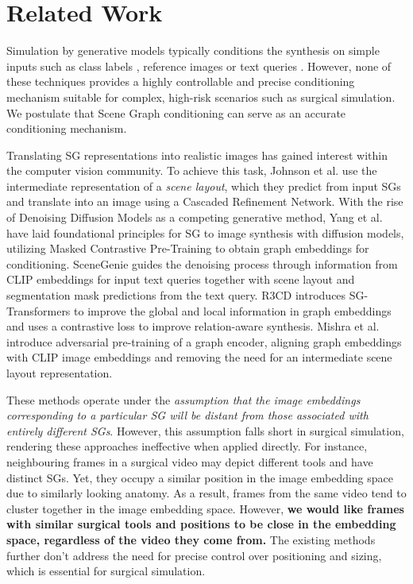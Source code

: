 \section{Related Work}
\label{sec:rw}

Simulation by generative models typically conditions the synthesis on simple inputs such as class labels \cite{muller2023multimodal, frisch2023synthesising}, reference images \cite{kim2022diffusion, fuchsharp} or text queries \cite{allmendinger2024navigating}. However, none of these techniques provides a highly controllable and precise conditioning mechanism suitable for complex, high-risk scenarios such as surgical simulation. We postulate that Scene Graph conditioning can serve as an accurate conditioning mechanism.

Translating SG representations into realistic images has gained interest within the computer vision community. To achieve this task, Johnson et al. \cite{johnson2018image} use the intermediate representation of a \emph{scene layout}, which they predict from input SGs and translate into an image using a Cascaded Refinement Network. With the rise of Denoising Diffusion Models \cite{ho2020denoising,dhariwal2021diffusion,rombach2022high} as a competing generative method, Yang et al. \cite{yang2022diffusion} have laid foundational principles for SG to image synthesis with diffusion models, utilizing Masked Contrastive Pre-Training to obtain graph embeddings for conditioning. SceneGenie \cite{farshad2023scenegenie} guides the denoising process through information from CLIP embeddings \cite{radford2021learning} for input text queries together with scene layout and segmentation mask predictions from the text query. R3CD \cite{liu2024r3cd} introduces SG-Transformers to improve the global and local information in graph embeddings and uses a contrastive loss to improve relation-aware synthesis. Mishra et al. \cite{mishra2024scene} introduce adversarial pre-training of a graph encoder, aligning graph embeddings with CLIP image embeddings \cite{radford2021learning} and removing the need for an intermediate scene layout representation. 

These methods operate under the \textit{assumption that the image embeddings corresponding to a particular SG will be distant from those associated with entirely different SGs}. However, this assumption falls short in surgical simulation, rendering these approaches ineffective when applied directly. For instance, neighbouring frames in a surgical video may depict different tools and have distinct SGs. Yet, they occupy a similar position in the image embedding space due to similarly looking anatomy. As a result, frames from the same video tend to cluster together in the image embedding space. However, \textbf{we would like frames with similar surgical tools and positions to be close in the embedding space, regardless of the video they come from.} The existing methods further don’t address the need for precise control over positioning and sizing, which is essential for surgical simulation.
